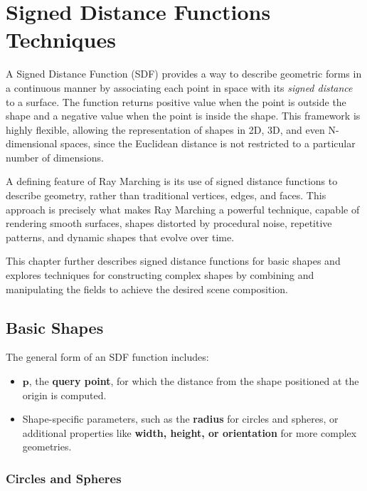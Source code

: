 \chapter{Signed Distance Functions Techniques}\label{chp:LABEL_CHP_3}

A Signed Distance Function (SDF) provides a way to describe geometric forms in a continuous manner by associating each point in space with its \textit{signed distance} to a surface. The function returns positive value when the point is outside the shape and a negative value when the point is inside the shape. This framework is highly flexible, allowing the representation of shapes in 2D, 3D, and even N-dimensional spaces, since the Euclidean distance is not restricted to a particular number of dimensions.  

A defining feature of Ray Marching is its use of signed distance functions to describe geometry, rather than traditional vertices, edges, and faces. This approach is precisely what makes Ray Marching a powerful technique, capable of rendering smooth surfaces, shapes distorted by procedural noise, repetitive patterns, and dynamic shapes that evolve over time.
    
This chapter further describes signed distance functions for basic shapes and explores techniques for constructing complex shapes by combining and manipulating the fields to achieve the desired scene composition.


\section{Basic Shapes}


The general form of an SDF function includes:  

\begin{itemize}
    \item $\mathbf{p}$, the \textbf{query point}, for which the distance from the shape positioned at the origin is computed.
    \item Shape-specific parameters, such as the \textbf{radius} for circles and spheres, or additional properties like \textbf{width, height, or orientation} for more complex geometries.
\end{itemize}

\subsection{Circles and Spheres}


